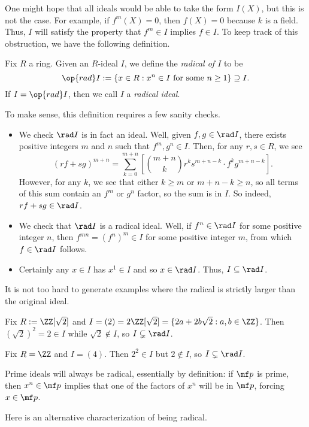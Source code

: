 One might hope that all ideals would be able to take the form $I(X)$, but this is not the case. For example, if $f^m(X)=0$, then $f(X)=0$ because $k$ is a field. Thus, $I$ will satisfy the property that $f^m\in I$ implies $f\in I$. To keep track of this obstruction, we have the following definition.
\begin{definition}[Radical]
	Fix $R$ a ring. Given an $R$-ideal $I$, we define the \textit{radical of $I$} to be
	\[\op{rad}I:=\left\{x\in R:x^n\in I\text{ for some }n\ge1\right\}\supseteq I.\]
	If $I=\op{rad}I$, then we call $I$ a \textit{radical ideal}.
\end{definition}
To make sense, this definition requires a few sanity checks.
\begin{itemize}
	\item We check $\rad I$ is in fact an ideal. Well, given $f,g\in\rad I$, there exists positive integers $m$ and $n$ such that $f^m,g^n\in I$. Then, for any $r,s\in R$, we see
	\[(rf+sg)^{m+n}=\sum_{k=0}^{m+n}\left[\binom{m+n}kr^ks^{m+n-k}\cdot f^kg^{m+n-k}\right].\]
	However, for any $k$, we see that either $k\ge m$ or $m+n-k\ge n$, so all terms of this sum contain an $f^m$ or $g^n$ factor, so the sum is in $I$. So indeed, $rf+sg\in\rad I$.
	\item We check that $\rad I$ is a radical ideal. Well, if $f^n\in\rad I$ for some positive integer $n$, then $f^{mn}=\left(f^n\right)^m\in I$ for some positive integer $m$, from which $f\in\rad I$ follows.
	\item Certainly any $x\in I$ has $x^1\in I$ and so $x\in\rad I$. Thus, $I\subseteq\rad I$.
\end{itemize}
It is not too hard to generate examples where the radical is strictly larger than the original ideal.
\begin{example}
	Fix $R:=\ZZ[\sqrt2]$ and $I=(2)=2\ZZ[\sqrt2]=\{2a+2b\sqrt2:a,b\in\ZZ\}$. Then $\left(\sqrt2\right)^2=2\in I$ while $\sqrt2\notin I$, so $I\subsetneq\rad I$.
\end{example}
\begin{example}
	Fix $R=\ZZ$ and $I=(4)$. Then $2^2\in I$ but $2\notin I$, so $I\subsetneq\rad I$.
\end{example}
\begin{remark}
	Prime ideals will always be radical, essentially by definition: if $\mf p$ is prime, then $x^n\in\mf p$ implies that one of the factors of $x^n$ will be in $\mf p$, forcing $x\in\mf p$.
\end{remark}
Here is an alternative characterization of being radical.
